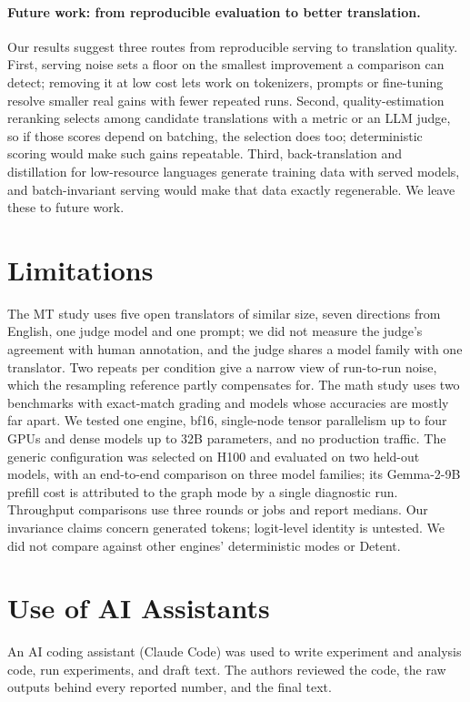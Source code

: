 \paragraph{Future work: from reproducible evaluation to better translation.} Our results suggest three routes from reproducible serving to translation quality. First, serving noise sets a floor on the smallest improvement a comparison can detect; removing it at low cost lets work on tokenizers, prompts or fine-tuning resolve smaller real gains with fewer repeated runs. Second, quality-estimation reranking selects among candidate translations with a metric or an LLM judge, so if those scores depend on batching, the selection does too; deterministic scoring would make such gains repeatable. Third, back-translation and distillation for low-resource languages generate training data with served models, and batch-invariant serving would make that data exactly regenerable. We leave these to future work.

\label{end-of-content}

\section{Limitations}
The MT study uses five open translators of similar size, seven directions from English, one judge model and one prompt; we did not measure the judge's agreement with human annotation, and the judge shares a model family with one translator. Two repeats per condition give a narrow view of run-to-run noise, which the resampling reference partly compensates for. The math study uses two benchmarks with exact-match grading and models whose accuracies are mostly far apart. We tested one engine, bf16, single-node tensor parallelism up to four GPUs and dense models up to 32B parameters, and no production traffic. The generic configuration was selected on H100 and evaluated on two held-out models, with an end-to-end comparison on three model families; its Gemma-2-9B prefill cost is attributed to the graph mode by a single diagnostic run. Throughput comparisons use three rounds or jobs and report medians. Our invariance claims concern generated tokens; logit-level identity \citep{qin2026vosti} is untested. We did not compare against other engines' deterministic modes or Detent.

\section*{Use of AI Assistants}
An AI coding assistant (Claude Code) was used to write experiment and analysis code, run experiments, and draft text. The authors reviewed the code, the raw outputs behind every reported number, and the final text.
